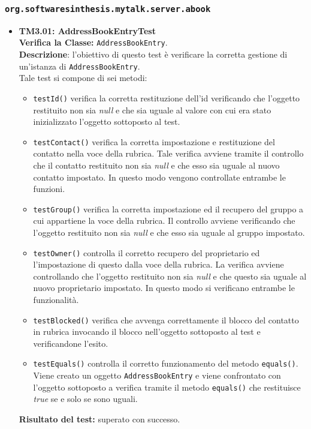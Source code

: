 \subsubsection{\texttt{org.softwaresinthesis.mytalk.server.abook}}
\begin{itemize}
\item \textbf{TM3.01: AddressBookEntryTest}\\
\textbf{Verifica la Classe:} \texttt{AddressBookEntry}.\\
\textbf{Descrizione}: l'obiettivo di questo test è verificare la corretta gestione di un'istanza di \texttt{AddressBookEntry}.\\
Tale test si compone di sei metodi:
\begin{itemize}
\item \texttt{testId()} verifica la corretta restituzione dell'id verificando che l'oggetto restituito non sia \textit{null} e che sia uguale al valore con cui era stato inizializzato l'oggetto sottoposto al test.
\item \texttt{testContact()} verifica la corretta impostazione e restituzione del contatto nella voce della rubrica. Tale verifica avviene tramite il controllo che il contatto restituito non sia \textit{null} e che esso sia uguale al nuovo contatto impostato. In questo modo vengono controllate entrambe le funzioni.
\item \texttt{testGroup()} verifica la corretta impostazione ed il recupero del gruppo a cui appartiene la voce della rubrica. Il controllo avviene verificando che l'oggetto restituito non sia \textit{null} e che esso sia uguale al gruppo impostato. 
\item \texttt{testOwner()} controlla il corretto recupero del proprietario ed l'impostazione di questo dalla voce della rubrica. La verifica avviene controllando che l'oggetto restituito non sia \textit{null} e che questo sia uguale al nuovo proprietario impostato. In questo modo si verificano entrambe le funzionalità.
\item \texttt{testBlocked()} verifica che avvenga correttamente il blocco del contatto in rubrica invocando il blocco nell'oggetto sottoposto al test e verificandone l'esito.
\item\texttt{testEquals()} controlla  il corretto funzionamento del metodo \texttt{equals()}. Viene creato un oggetto \texttt{AddressBookEntry} e viene confrontato con l'oggetto sottoposto a verifica tramite il metodo \texttt{equals()} che restituisce \textit{true} se e solo se sono uguali.
\end{itemize}
\textbf{Risultato del test:} superato con successo.


\end{itemize}
